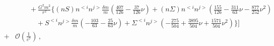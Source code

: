 {\begin{eqnarray}
 &&\qquad+\frac{G^{2}m^{2}}{r^{2}}\bigg\{
 (nS) n^{<i} n^{j>}\frac{\delta m}{m}\left(\frac{407}{126} -\frac{37}{126} \nu\right)
 + (n\Sigma ) n^{<i} n^{j>}\left(\frac{155}{126} -\frac{311}{63} \nu -\frac{877}{252} \nu^2\right) \nonumber \\ 
&&\qquad\quad + S^{<i} n^{j>}\frac{\delta m}{m}\left(-\frac{103}{63} -\frac{25}{63} \nu\right)
+ \Sigma^{<i} n^{j>}\left(-\frac{275}{504} + \frac{3895}{504} \nu + \frac{1571}{504} \nu^2\right)
\bigg\}\Bigg]\nonumber\\
&+&\mathcal{O}\left(\frac{1}{c^7}\right)\,,
\end{eqnarray}}